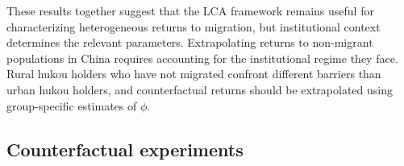 \documentclass[12pt]{article}
\begin{document}


These results together suggest that the LCA framework remains useful for characterizing heterogeneous returns to migration, but institutional context determines the relevant parameters.
Extrapolating returns to non-migrant populations in China requires accounting for the institutional regime they face.
Rural hukou holders who have not migrated confront different barriers than urban hukou holders, and counterfactual returns should be extrapolated using group-specific estimates of $\phi$.




\subsection{Counterfactual experiments}\label{sec:counterfactuals}
\end{document}
